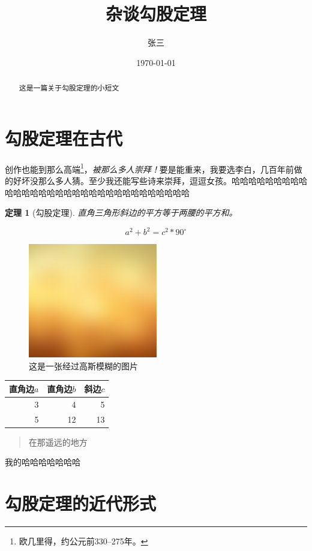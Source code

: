 \documentclass[UTF8]{ctexart}
\title{杂谈勾股定理}
\author{张三}
\date{\today}
\newtheorem{thm}{定理}
\begin{document}
\maketitle

\begin{abstract}
这是一篇关于勾股定理的小短文
\end{abstract}

\tableofcontents
\section{勾股定理在古代}

创作也能到那么高端\footnote{欧几里得，约公元前330--275年。}，\emph{被那么多人崇拜！}要是能重来，我要选李白，几百年前做的好坏没那么多人猜。至少我还能写些诗来崇拜，逗逗女孩。哈哈哈哈哈哈哈哈哈哈哈哈哈哈哈哈哈哈哈哈哈哈哈哈哈哈哈哈哈哈哈

\begin{thm}[勾股定理]
直角三角形斜边的平方等于两腰的平方和。
\end{thm}

\begin{equation}
a^2 + b^2 = c^2 * 90^\circ
\end{equation}

\begin{figure}[ht]
\centering
\includegraphics[height = 5cm]{hello.png}
\caption{这是一张经过高斯模糊的图片}
\label{fig:hello}
\end{figure}

\begin{table}[H]
\begin{tabular}{|rrr|}
\hline
直角边$a$ &直角边$b$ &斜边$c$\\
\hline
3&4&5\\
5&12&13\\
\hline
\end{tabular}
\end{table}

\begin{quote}
\kaishu 在那遥远的地方
\end{quote}

我的哈哈哈哈哈哈哈

\section{勾股定理的近代形式}

\end{document}

